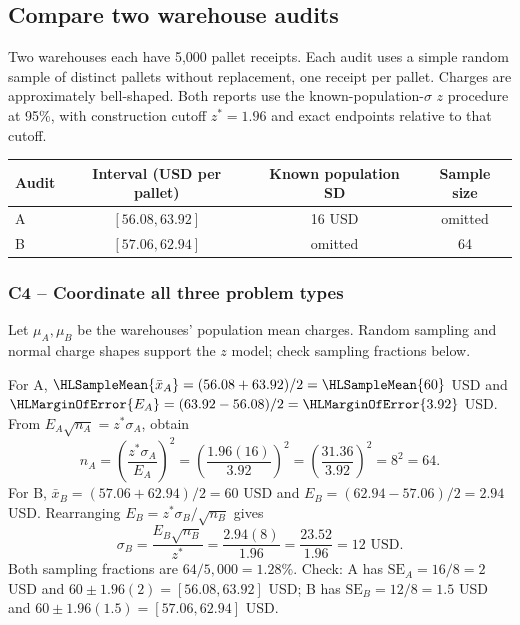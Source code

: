 \subsection{Compare two warehouse audits}\label{prob:c4-advanced-1}
Two warehouses each have 5,000 pallet receipts. Each audit uses a simple random sample of distinct pallets without replacement, one receipt per pallet. Charges are approximately bell-shaped. Both reports use the known-population-$\sigma$ $z$ procedure at 95\%, with construction cutoff $z^*=1.96$ and exact endpoints relative to that cutoff.
\begin{center}
\begin{tabular}{@{}lccc@{}}\toprule
Audit&Interval (USD per pallet)&Known population SD&Sample size\\\midrule
A&$[56.08,63.92]$&16 USD&omitted\\
B&$[57.06,62.94]$&omitted&64\\\bottomrule
\end{tabular}
\end{center}
\subsubsection*{C4 -- Coordinate all three problem types}\label{sol:c4-advanced-1}
Let $\mu_A,\mu_B$ be the warehouses' population mean charges. Random sampling and normal charge shapes support the $z$ model; check sampling fractions below.

For A, $\HLSampleMean{\bar x_A}=(56.08+63.92)/2=\HLSampleMean{60}$ USD and $\HLMarginOfError{E_A}=(63.92-56.08)/2=\HLMarginOfError{3.92}$ USD.
From $E_A\sqrt{n_A}=z^*\sigma_A$, obtain
\[
n_A=\left(\frac{z^*\sigma_A}{E_A}\right)^2
=\left(\frac{1.96(16)}{3.92}\right)^2
=\left(\frac{31.36}{3.92}\right)^2=8^2=64.
\]
For B, $\bar x_B=(57.06+62.94)/2=60$ USD and $E_B=(62.94-57.06)/2=2.94$ USD. Rearranging $E_B=z^*\sigma_B/\sqrt{n_B}$ gives
\[
\sigma_B=\frac{E_B\sqrt{n_B}}{z^*}
=\frac{2.94(8)}{1.96}=\frac{23.52}{1.96}=12\text{ USD}.
\]
Both sampling fractions are $64/5{,}000=1.28\%$. Check: A has $\mathrm{SE}_A=16/8=2$ USD and $60\pm1.96(2)=[56.08,63.92]$ USD; B has $\mathrm{SE}_B=12/8=1.5$ USD and $60\pm1.96(1.5)=[57.06,62.94]$ USD.

